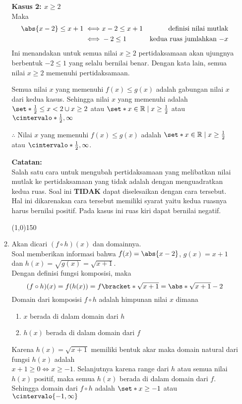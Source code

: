 \begin{enumerate}[leftmargin=*, label={\arabic*}.]
\begin{enumerate}[label={\alph*}.]
\textbf{Kasus 2: $x \geq 2$}\\
Maka
\begin{align*}
    \abs{x-2} \leq x+1
    \iff &x-2 \leq x+1 
    &\text{definisi nilai mutlak} \\
    \iff &-2 \leq 1
    &\text{kedua ruas jumlahkan $-x$}
\end{align*}
Ini menandakan untuk semua nilai $x \geq 2$ pertidaksamaan akan ujungnya 
berbentuk $-2 \leq 1$ yang selalu bernilai benar. Dengan kata lain, semua 
nilai $x \geq 2$ memenuhi pertidaksamaan.
    
Semua nilai $x$ yang memenuhi $f(x) \leq g(x)$ adalah gabungan nilai $x$ 
dari kedua kasus. Sehingga nilai $x$ yang memenuhi adalah 
$\set*{\frac{1}{2} \leq x < 2 \cup x \geq 2}$ atau 
$\set*{x \in \mathbb{R} \mid x \geq \frac{1}{2}}$
atau $\cintervalo*{\frac{1}{2}, \infty}$
    
$\therefore$ Nilai $x$ yang memenuhi $f(x) \leq g(x)$ adalah
$\set*{x \in \mathbb{R} \mid x \geq \frac{1}{2}}$ atau
$\cintervalo*{\frac{1}{2}, \infty}$.
    
\vspace{0.1cm}
\textbf{Catatan:}\\
Salah satu cara untuk mengubah pertidaksamaan yang melibatkan nilai mutlak 
ke pertidaksamaan yang tidak adalah dengan menguadratkan kedua ruas. Soal 
ini \textbf{TIDAK} dapat diselesaikan dengan cara tersebut. Hal ini 
dikarenakan cara tersebut memiliki syarat yaitu kedua ruasnya harus bernilai 
positif. Pada kasus ini ruas kiri dapat bernilai negatif.
\begin{center}
    \line(1,0){150}
\end{center}
\item Akan dicari $(f \circ h)(x)$ dan domainnya.\\
Soal memberikan informasi bahwa $f(x) = \abs{x-2}$, $g(x) = x+1$ dan 
$h(x) = \sqrt{g(x)} = \sqrt{x+1}$.\\
Dengan definisi fungsi komposisi, maka
\[
    (f \circ h)(x) = f(h(x)) = f\bracket*{\sqrt{x+1}} = \abs*{\sqrt{x+1}-2}
\]
Domain dari komposisi $f \circ h$ adalah himpunan nilai $x$ dimana
\begin{enumerate}[label={\arabic*})]
    \item $x$ berada di dalam domain dari $h$
    \item $h(x)$ berada di dalam domain dari $f$
\end{enumerate}
Karena $h(x) = \sqrt{x+1}$ memiliki bentuk akar maka domain natural dari 
fungsi $h(x)$ adalah \\ $x+1 \geq 0 \iff x \geq -1$.
Selanjutnya karena range dari $h$ atau semua nilai $h(x)$ positif, maka
semua $h(x)$ berada di dalam domain dari $f$. Sehingga domain dari 
$f \circ h$ adalah $\set*{x \geq -1}$ atau $\cintervalo{-1,\infty}$
    

\end{enumerate}
\end{enumerate}
